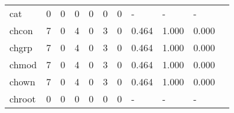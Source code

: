 \begin{longtable}{lp{1.2cm}p{1.2cm}p{1.2cm}p{1.2cm}p{1.2cm}p{1.2cm}p{1.2cm}p{1.2cm}p{1.2cm}p{1.2cm}}
cat       &                                     0 &                                                  0 &                                                0 &                                               0 &                                                0 &                                              0 &                                             - &                                                  - &                                                  - \\
chcon     &                                     7 &                                                  0 &                                                4 &                                               0 &                                                3 &                                              0 &                                         0.464 &                                              1.000 &                                              0.000 \\
chgrp     &                                     7 &                                                  0 &                                                4 &                                               0 &                                                3 &                                              0 &                                         0.464 &                                              1.000 &                                              0.000 \\
chmod     &                                     7 &                                                  0 &                                                4 &                                               0 &                                                3 &                                              0 &                                         0.464 &                                              1.000 &                                              0.000 \\
chown     &                                     7 &                                                  0 &                                                4 &                                               0 &                                                3 &                                              0 &                                         0.464 &                                              1.000 &                                              0.000 \\
chroot    &                                     0 &                                                  0 &                                                0 &                                               0 &                                                0 &                                              0 &                                             - &                                                  - &                                                  - \\

\end{longtable}
